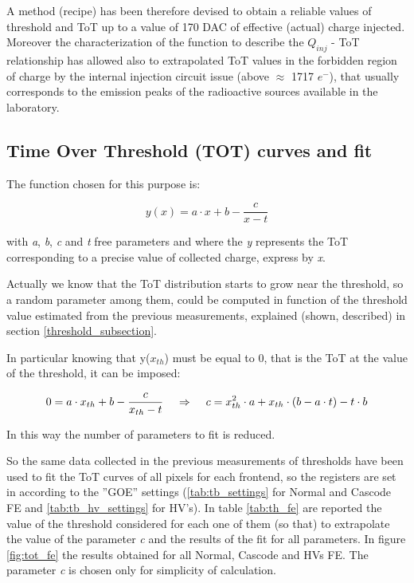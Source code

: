 A method (recipe) has been therefore devised to obtain a reliable values of threshold and ToT up to a value of 170 DAC of effective (actual) charge injected. Moreover the characterization of the function to describe the $Q_{inj}$ - ToT relationship has allowed also to extrapolated ToT values in the forbidden region of charge by the internal injection circuit issue (above $\approx$ 1717 $e^{-}$), that usually corresponds to the emission peaks of the radioactive sources available in the laboratory.


\subsection{Time Over Threshold (TOT) curves and fit} \label{tot_fit}

The function chosen for this purpose is:

\begin{equation}
y(x) = a\cdot x +b -\frac{c}{x-t}
\label{fit_function}
\end{equation}

with \textit{a}, \textit{b}, \textit{c} and \textit{t} free parameters and where the \textit{y} represents the ToT corresponding to a precise value of collected charge, express by \textit{x}. 

Actually we know that the ToT distribution starts to grow near the threshold, so a random parameter among them, could be computed in function of the threshold value estimated from the previous measurements, explained (shown, described) in section \ref{threshold_subsection}.

In particular knowing that y($x_{th}$) must be equal to 0, that is the ToT at the value of the threshold, it can be imposed:

\begin{equation}
0 = a\cdot x_{th} + b - \frac{c}{x_{th}-t}  \hspace{.4cm}	\Rightarrow  \hspace{.4cm}	c = x_{th}^{2}\cdot a + x_{th}\cdot (b-a\cdot t) - t\cdot b
\end{equation}

In this way the number of parameters to fit is reduced.

So the same data collected in the previous measurements of thresholds have been used to fit the ToT curves of all pixels for each frontend, so the registers are set in according to the ''GOE'' settings (\vref{tab:tb_settings} for Normal and Cascode FE and \vref{tab:tb_hv_settings} for HV's).
In table \vref{tab:th_fe} are reported the value of the threshold considered for each one of them (so that) to extrapolate the value of the parameter \textit{c} and the results of the fit for all parameters. In figure \vref{fig:tot_fe} the results obtained for all Normal, Cascode and HVs FE. The parameter \textit{c} is chosen only for simplicity of calculation.

